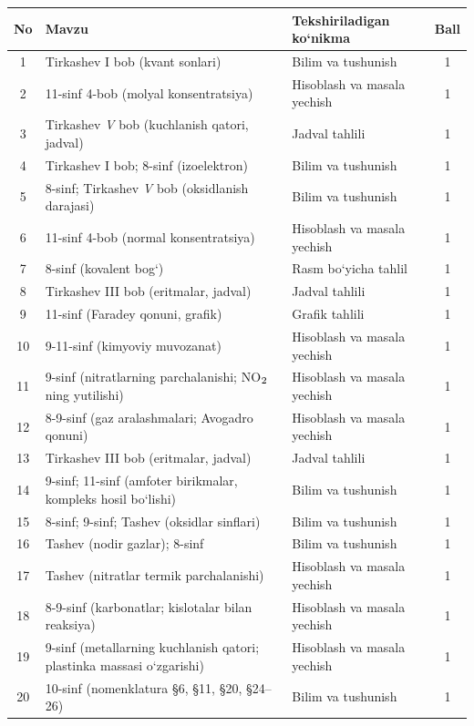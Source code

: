 \documentclass[11pt,a4paper]{article}
\renewcommand{\textsubscript}[1]{\ensuremath{_{\text{\fontsize{8}{8}\selectfont #1}}}}
\begin{document}
{\small\noindent\begin{longtable}{|c|p{7.2cm}|p{5.4cm}|c|}\hline \textbf{No} & \textbf{Mavzu} & \textbf{Tekshiriladigan ko`nikma} & \textbf{Ball}\\\hline
1 & Tirkashev I bob (kvant sonlari) & Bilim va tushunish & 1\\\hline
2 & 11-sinf 4-bob (molyal konsentratsiya) & Hisoblash va masala yechish & 1\\\hline
3 & Tirkashev \textit{V} bob (kuchlanish qatori, jadval) & Jadval tahlili & 1\\\hline
4 & Tirkashev I bob; 8-sinf (izoelektron) & Bilim va tushunish & 1\\\hline
5 & 8-sinf; Tirkashev \textit{V} bob (oksidlanish darajasi) & Bilim va tushunish & 1\\\hline
6 & 11-sinf 4-bob (normal konsentratsiya) & Hisoblash va masala yechish & 1\\\hline
7 & 8-sinf (kovalent bog`) & Rasm bo`yicha tahlil & 1\\\hline
8 & Tirkashev III bob (eritmalar, jadval) & Jadval tahlili & 1\\\hline
9 & 11-sinf (Faradey qonuni, grafik) & Grafik tahlili & 1\\\hline
10 & 9-11-sinf (kimyoviy muvozanat) & Hisoblash va masala yechish & 1\\\hline
11 & 9-sinf (nitratlarning parchalanishi; NO\textsubscript{2} ning yutilishi) & Hisoblash va masala yechish & 1\\\hline
12 & 8-9-sinf (gaz aralashmalari; Avogadro qonuni) & Hisoblash va masala yechish & 1\\\hline
13 & Tirkashev III bob (eritmalar, jadval) & Jadval tahlili & 1\\\hline
14 & 9-sinf; 11-sinf (amfoter birikmalar, kompleks hosil bo`lishi) & Bilim va tushunish & 1\\\hline
15 & 8-sinf; 9-sinf; Tashev (oksidlar sinflari) & Bilim va tushunish & 1\\\hline
16 & Tashev (nodir gazlar); 8-sinf & Bilim va tushunish & 1\\\hline
17 & Tashev (nitratlar termik parchalanishi) & Hisoblash va masala yechish & 1\\\hline
18 & 8-9-sinf (karbonatlar; kislotalar bilan reaksiya) & Hisoblash va masala yechish & 1\\\hline
19 & 9-sinf (metallarning kuchlanish qatori; plastinka massasi o`zgarishi) & Hisoblash va masala yechish & 1\\\hline
20 & 10-sinf (nomenklatura \S{}6, \S{}11, \S{}20, \S{}24--26) & Bilim va tushunish & 1\\\hline

\end{longtable}}
\end{document}
